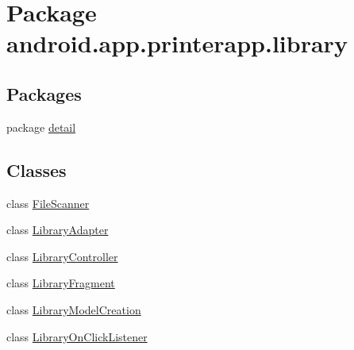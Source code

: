 \hypertarget{namespaceandroid_1_1app_1_1printerapp_1_1library}{}\section{Package android.\+app.\+printerapp.\+library}
\label{namespaceandroid_1_1app_1_1printerapp_1_1library}
\subsection*{Packages}
\begin{DoxyCompactItemize}
\item 
package \hyperlink{namespaceandroid_1_1app_1_1printerapp_1_1library_1_1detail}{detail}
\end{DoxyCompactItemize}
\subsection*{Classes}
\begin{DoxyCompactItemize}
\item 
class \hyperlink{classandroid_1_1app_1_1printerapp_1_1library_1_1_file_scanner}{File\+Scanner}
\item 
class \hyperlink{classandroid_1_1app_1_1printerapp_1_1library_1_1_library_adapter}{Library\+Adapter}
\item 
class \hyperlink{classandroid_1_1app_1_1printerapp_1_1library_1_1_library_controller}{Library\+Controller}
\item 
class \hyperlink{classandroid_1_1app_1_1printerapp_1_1library_1_1_library_fragment}{Library\+Fragment}
\item 
class \hyperlink{classandroid_1_1app_1_1printerapp_1_1library_1_1_library_model_creation}{Library\+Model\+Creation}
\item 
class \hyperlink{classandroid_1_1app_1_1printerapp_1_1library_1_1_library_on_click_listener}{Library\+On\+Click\+Listener}
\end{DoxyCompactItemize}
